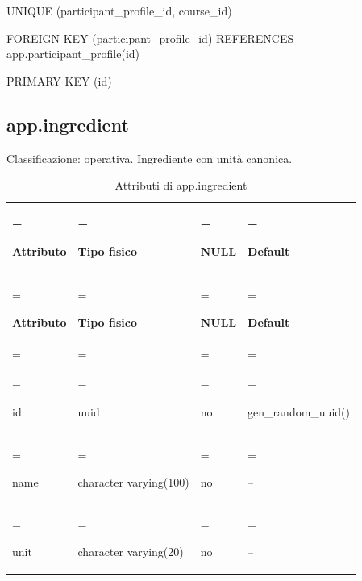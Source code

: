 \documentclass[11pt,a4paper]{article}
\begin{document}
{\ttfamily\small UNIQUE (\allowbreak{}participant\_\allowbreak{}profile\_\allowbreak{}id,\allowbreak{} course\_\allowbreak{}id)}\par

{\ttfamily\small FOREIGN KEY (\allowbreak{}participant\_\allowbreak{}profile\_\allowbreak{}id) REFERENCES app.\allowbreak{}participant\_\allowbreak{}profile(\allowbreak{}id)}\par

{\ttfamily\small PRIMARY KEY (\allowbreak{}id)}\par

\subsection{app.ingredient}

Classificazione: operativa. Ingrediente con unità canonica.

{\small \renewcommand{\arraystretch}{1.2}

\begin{xltabular}{\linewidth}{>{\hsize\linewidth=\hsize\raggedright\arraybackslash}X>{\hsize\linewidth=\hsize\raggedright\arraybackslash}X>{\hsize\linewidth=\hsize\raggedright\arraybackslash}X>{\hsize\linewidth=\hsize\raggedright\arraybackslash}X}
\caption{Attributi di app.ingredient}\label{tab:dictionary-14}\\
\toprule

\textbf{Attributo} & \textbf{Tipo fisico} & \textbf{NULL} & \textbf{Default}\\\midrule\endfirsthead\toprule\textbf{Attributo} & \textbf{Tipo fisico} & \textbf{NULL} & \textbf{Default}\\\midrule\endhead
\midrule{}\\\endfoot\bottomrule\endlastfoot


{\ttfamily\small id} & {\ttfamily\small uuid} & no & {\ttfamily\small gen\_\allowbreak{}random\_\allowbreak{}uuid(\allowbreak{})}\\\addlinespace[3pt]

{\ttfamily\small name} & {\ttfamily\small character varying(\allowbreak{}100)} & no & {\ttfamily\small --}\\\addlinespace[3pt]

{\ttfamily\small unit} & {\ttfamily\small character varying(\allowbreak{}20)} & no & {\ttfamily\small --}\\*

\end{xltabular}}
\end{document}
